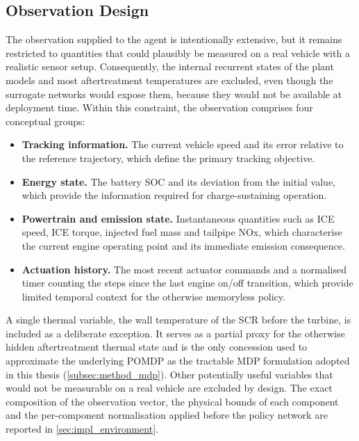 
\subsection{Observation Design}
\label{subsec:method_observation}

The observation supplied to the agent is intentionally extensive, but it remains restricted to quantities that could plausibly be measured on a real vehicle with a realistic sensor setup. Consequently, the internal recurrent states of the plant models and most aftertreatment temperatures are excluded, even though the surrogate networks would expose them, because they would not be available at deployment time. Within this constraint, the observation comprises four conceptual groups:

\begin{itemize}
  \item \textbf{Tracking information.} The current vehicle speed and its error relative to the reference trajectory, which define the primary tracking objective.
  \item \textbf{Energy state.} The battery \ac{SOC} and its deviation from the initial value, which provide the information required for charge-sustaining operation.
  \item \textbf{Powertrain and emission state.} Instantaneous quantities such as \ac{ICE} speed, \ac{ICE} torque, injected fuel mass and tailpipe \ac{NOx}, which characterise the current engine operating point and its immediate emission consequence.
  \item \textbf{Actuation history.} The most recent actuator commands and a normalised timer counting the steps since the last engine on/off transition, which provide limited temporal context for the otherwise memoryless policy.
\end{itemize}

A single thermal variable, the wall temperature of the \ac{SCR} before the turbine, is included as a deliberate exception. It serves as a partial proxy for the otherwise hidden aftertreatment thermal state and is the only concession used to approximate the underlying \ac{POMDP} as the tractable \ac{MDP} formulation adopted in this thesis (\autoref{subsec:method_mdp}). Other potentially useful variables that would not be measurable on a real vehicle are excluded by design. The exact composition of the observation vector, the physical bounds of each component and the per-component normalisation applied before the policy network are reported in \autoref{sec:impl_environment}.

